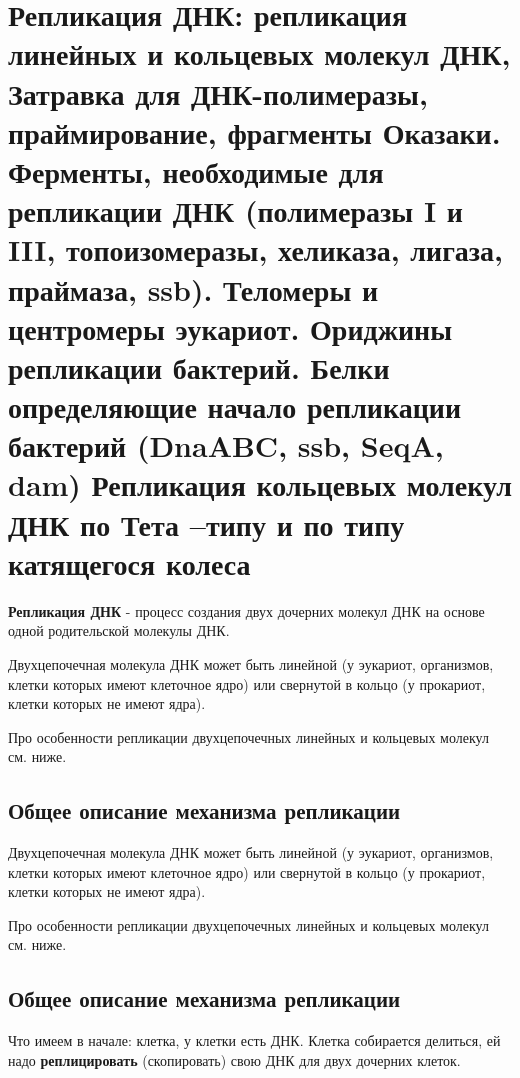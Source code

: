 \section{Репликация ДНК: репликация линейных и кольцевых молекул ДНК, 
Затравка для ДНК-полимеразы, праймирование, фрагменты Оказаки. 
Ферменты, необходимые для репликации ДНК (полимеразы I и III, топоизомеразы, хеликаза, лигаза, 
праймаза, ssb). 
Теломеры и центромеры эукариот. Ориджины репликации бактерий. Белки определяющие начало 
репликации бактерий (DnaABC, ssb, SeqA, dam) Репликация кольцевых молекул ДНК по Тета –типу и по типу катящегося колеса}


\textbf{Репликация ДНК} - процесс создания двух дочерних молекул ДНК на основе одной родительской молекулы ДНК. 

Двухцепочечная молекула ДНК может быть линейной (у эукариот, организмов, клетки которых имеют  клеточное ядро) или свернутой в кольцо (у прокариот, клетки которых не имеют ядра). 

Про особенности репликации двухцепочечных линейных и кольцевых молекул см. ниже.

\subsection{Общее описание механизма репликации}
Двухцепочечная молекула ДНК может быть линейной (у эукариот, организмов, клетки которых имеют  клеточное ядро) или свернутой в кольцо (у прокариот, клетки которых не имеют ядра). 

Про особенности репликации двухцепочечных линейных и кольцевых молекул см. ниже.

\subsection{Общее описание механизма репликации}
Что имеем в начале: клетка, у клетки есть ДНК. Клетка собирается делиться, ей надо \textbf{реплицировать} (скопировать) свою ДНК для двух дочерних клеток.


